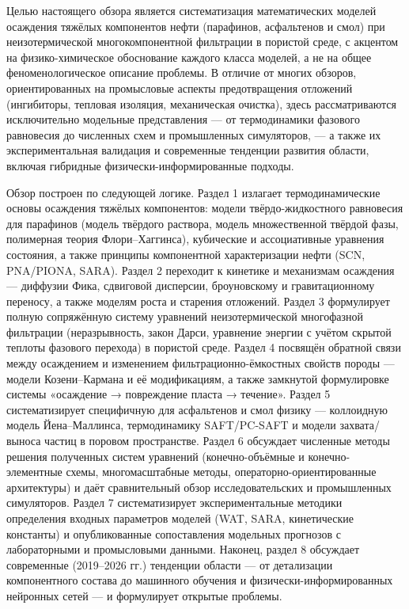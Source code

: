 \documentclass[11pt]{extarticle}
\begin{document}
Целью настоящего обзора является систематизация математических моделей осаждения тяжёлых компонентов нефти (парафинов, асфальтенов и смол) при неизотермической многокомпонентной фильтрации в пористой среде, с акцентом на физико-химическое обоснование каждого класса моделей, а не на общее феноменологическое описание проблемы. В отличие от многих обзоров, ориентированных на промысловые аспекты предотвращения отложений (ингибиторы, тепловая изоляция, механическая очистка), здесь рассматриваются исключительно модельные представления --- от термодинамики фазового равновесия до численных схем и промышленных симуляторов, --- а также их экспериментальная валидация и современные тенденции развития области, включая гибридные физически-информированные подходы.

Обзор построен по следующей логике. Раздел 1 излагает термодинамические основы осаждения тяжёлых компонентов: модели твёрдо-жидкостного равновесия для парафинов (модель твёрдого раствора, модель множественной твёрдой фазы, полимерная теория Флори--Хаггинса), кубические и ассоциативные уравнения состояния, а также принципы компонентной характеризации нефти (SCN, PNA/PIONA, SARA). Раздел 2 переходит к кинетике и механизмам осаждения --- диффузии Фика, сдвиговой дисперсии, броуновскому и гравитационному переносу, а также моделям роста и старения отложений. Раздел 3 формулирует полную сопряжённую систему уравнений неизотермической многофазной фильтрации (неразрывность, закон Дарси, уравнение энергии с учётом скрытой теплоты фазового перехода) в пористой среде. Раздел 4 посвящён обратной связи между осаждением и изменением фильтрационно-ёмкостных свойств породы --- модели Козени--Кармана и её модификациям, а также замкнутой формулировке системы «осаждение → повреждение пласта → течение». Раздел 5 систематизирует специфичную для асфальтенов и смол физику --- коллоидную модель Йена--Маллинса, термодинамику SAFT/PC-SAFT и модели захвата/выноса частиц в поровом пространстве. Раздел 6 обсуждает численные методы решения полученных систем уравнений (конечно-объёмные и конечно-элементные схемы, многомасштабные методы, операторно-ориентированные архитектуры) и даёт сравнительный обзор исследовательских и промышленных симуляторов. Раздел 7 систематизирует экспериментальные методики определения входных параметров моделей (WAT, SARA, кинетические константы) и опубликованные сопоставления модельных прогнозов с лабораторными и промысловыми данными. Наконец, раздел 8 обсуждает современные (2019--2026 гг.) тенденции области --- от детализации компонентного состава до машинного обучения и физически-информированных нейронных сетей --- и формулирует открытые проблемы.
\end{document}
